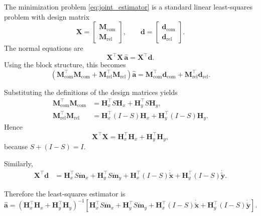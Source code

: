 \documentclass{article}
\begin{document}
The minimization problem \eqref{eq:joint_estimator} is a standard linear
least-squares problem with design matrix
\begin{equation}
\mathbf X =
\begin{bmatrix}
\mathbf{M}_{\mathrm{com}}\\
\mathbf{M}_{\mathrm{rel}}
\end{bmatrix},
\qquad
\mathbf d =
\begin{bmatrix}
\mathbf{d}_{\mathrm{com}}\\
\mathbf{d}_{\mathrm{rel}}
\end{bmatrix}.
\end{equation}
The normal equations are
\begin{equation}
\mathbf X^\top \mathbf X\, \hat{\mathbf a}
=
\mathbf X^\top \mathbf d.
\end{equation}
Using the block structure, this becomes
\begin{equation}
\left(
\mathbf{M}_{\mathrm{com}}^\top \mathbf{M}_{\mathrm{com}}
+
\mathbf{M}_{\mathrm{rel}}^\top \mathbf{M}_{\mathrm{rel}}
\right)\hat{\mathbf a}
=
\mathbf{M}_{\mathrm{com}}^\top \mathbf{d}_{\mathrm{com}}
+
\mathbf{M}_{\mathrm{rel}}^\top \mathbf{d}_{\mathrm{rel}}.
\label{eq:normal_equations}
\end{equation}

Substituting the definitions of the design matrices yields
\begin{align}
\mathbf{M}_{\mathrm{com}}^\top \mathbf{M}_{\mathrm{com}}
&=
\mathbf{H}_x^\top S \mathbf{H}_x
+
\mathbf{H}_y^\top S \mathbf{H}_y,
\\
\mathbf{M}_{\mathrm{rel}}^\top \mathbf{M}_{\mathrm{rel}}
&=
\mathbf{H}_x^\top (I-S) \mathbf{H}_x
+
\mathbf{H}_y^\top (I-S) \mathbf{H}_y.
\end{align}
Hence
\begin{equation}
\mathbf{X}^\top \mathbf{X}
=
\mathbf{H}_x^\top \mathbf{H}_x
+
\mathbf{H}_y^\top \mathbf{H}_y,
\end{equation}
because
\(
S + (I-S) = I.
\)

Similarly,
\begin{align}
\mathbf{X}^\top \mathbf d
&=
\mathbf{H}_x^\top S \dot{\mathbf m}_x
+
\mathbf{H}_y^\top S \dot{\mathbf m}_y
+
\mathbf{H}_x^\top (I-S)\dot{\tilde{\mathbf x}}
+
\mathbf{H}_y^\top (I-S)\dot{\tilde{\mathbf y}}.
\end{align}

Therefore the least-squares estimator is
\begin{equation}
\hat{\mathbf a}
=
\left(
\mathbf{H}_x^\top \mathbf{H}_x
+
\mathbf{H}_y^\top \mathbf{H}_y
\right)^{-1}
\left[
\mathbf{H}_x^\top S \dot{\mathbf m}_x
+
\mathbf{H}_y^\top S \dot{\mathbf m}_y
+
\mathbf{H}_x^\top (I-S)\dot{\tilde{\mathbf x}}
+
\mathbf{H}_y^\top (I-S)\dot{\tilde{\mathbf y}}
\right].
\label{eq:final_estimator}
\end{equation}
\end{document}
